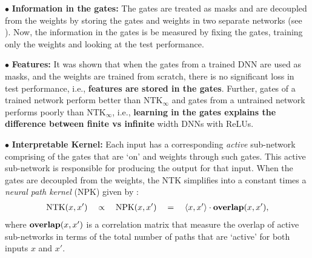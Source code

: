 $\bullet$ \textbf{Information in the gates:} The gates are treated as masks and are decoupled from the weights by storing the gates and weights in two separate networks (see ). Now, the information in the gates is be measured by fixing the gates, training only the weights and looking at the test performance.  

$\bullet$ \textbf{Features:} It was shown that when the gates from a trained DNN are used as masks, and the weights are trained from scratch, there is no significant loss in test performance, i.e., \textbf{features are stored in the gates}. Further, gates of a trained network perform better than $\text{NTK}_{\infty}$ and gates from a untrained network performs poorly than $\text{NTK}_{\infty}$, i.e., \textbf{learning in the gates explains the difference between finite vs infinite} width DNNs with ReLUs.

$\bullet$ \textbf{Interpretable Kernel:} Each input has a corresponding \emph{active} sub-network comprising of the gates that are `on' and weights through such gates. This active sub-network is responsible for producing the output for that input. When the gates are decoupled from the weights, the NTK simplifies into a constant times a \emph{neural path kernel} (NPK) given by :
\begin{align}\label{eq:ntk-npk-relation}
\text{NTK}(x,x')\quad\propto\quad \text{NPK}(x,x')\quad =\quad \langle x,x'\rangle\cdot {\bf{overlap}}(x,x'),
\end{align}
where ${\bf{overlap}}(x,x')$ is a correlation matrix that measure the overlap of active sub-networks in terms of the  total number of paths that are `active' for both inputs $x$ and $x'$. 

